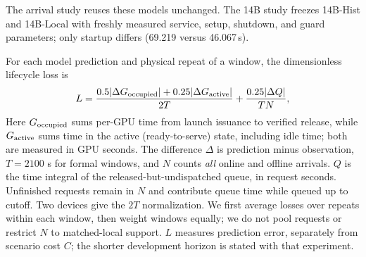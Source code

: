 The arrival study reuses these models unchanged. The 14B study freezes
14B-Hist and 14B-Local with freshly measured service, setup, shutdown,
and guard parameters; only startup differs (69.219 versus 46.067\,s).

For each model prediction and physical repeat of a window, the dimensionless
lifecycle loss is
\begin{equation}
 L=\frac{0.5|\Delta G_{\rm occupied}|+0.25|\Delta G_{\rm active}|}{2T}
   +\frac{0.25|\Delta Q|}{TN},
 \label{eq:lifecycle-loss}
\end{equation}
Here $G_{\rm occupied}$ sums per-GPU time from launch issuance to
verified release, while $G_{\rm active}$ sums time in the active (ready-to-serve) state,
including idle time; both are measured in GPU seconds.
The difference $\Delta$ is prediction minus observation, $T=2100$ s for formal windows,
and $N$ counts \emph{all} online and offline arrivals. $Q$ is the time integral
of the released-but-undispatched queue, in request seconds. Unfinished requests
remain in $N$ and contribute queue time while queued up to cutoff. Two devices
give the $2T$ normalization. We first average losses over repeats within each
window, then weight windows equally; we do not pool requests or restrict $N$ to
matched-local support. $L$ measures prediction error, separately from scenario
cost $C$; the shorter development horizon is stated with that experiment.

